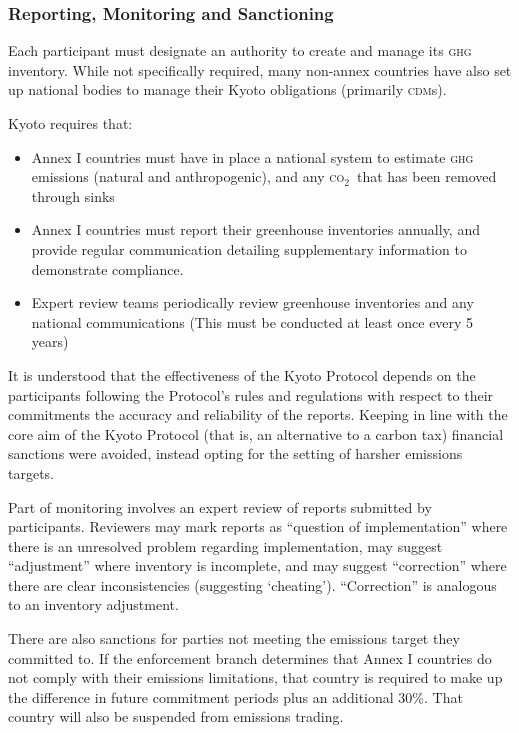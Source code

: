 \documentclass[]{article} %
\newcommand{\CO}{\textsc{co}$_2$~}
\begin{document}
\subsubsection{Reporting, Monitoring and Sanctioning}

Each participant must designate an authority to create and manage its \textsc{ghg} inventory. While not specifically required, many non-annex countries have also set up national bodies to manage their Kyoto obligations (primarily \textsc{cdm}s).

Kyoto requires that:~\cite{UNFCCC-Kyoto-guidelines}

\begin{itemize}
	\item Annex I countries must have in place a national system to estimate \textsc{ghg} emissions (natural and anthropogenic), and any \CO that has been removed through sinks
	\item Annex I countries must report their greenhouse inventories annually, and provide regular communication detailing supplementary information to demonstrate compliance.
	\item Expert review teams periodically review greenhouse inventories and any national communications (This must be conducted at least once every 5 years)
\end{itemize}

It is understood that the effectiveness of the Kyoto Protocol depends on the participants following the Protocol’s rules and regulations with respect to their commitments the accuracy and reliability of the reports. Keeping in line with the core aim of the Kyoto Protocol (that is, an alternative to a carbon tax) financial sanctions were avoided, instead opting for the setting of harsher emissions targets.

Part of monitoring involves an expert review of reports submitted by participants. Reviewers may mark reports as “question of implementation” where there is an unresolved problem regarding implementation, may suggest “adjustment” where inventory is incomplete, and may suggest “correction” where there are clear inconsistencies (suggesting ‘cheating’). “Correction” is analogous to an inventory adjustment.~\cite{UNFCCC-reporting-review}

There are also sanctions for parties not meeting the emissions target they committed to. If the enforcement branch determines that Annex I countries do not comply with their emissions limitations, that country is required to make up the difference in future commitment periods plus an additional 30\%. That country will also be suspended from emissions trading.~\cite{UNFCCC-compliance}
\end{document}
